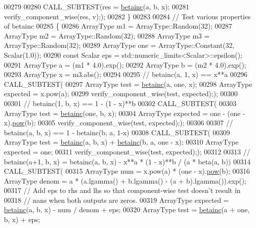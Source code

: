 \begin{DoxyCode}
00279 
00280     CALL\_SUBTEST(res = \hyperlink{namespace_eigen_a726eae91d4e91d8e25cbe55fffa6a92f}{betainc}(a, b, x);
00281                  verify\_component\_wise(res, v););
00282   \}
00283 
00284   \textcolor{comment}{// Test various properties of betainc}
00285   \{
00286     ArrayType m1 = ArrayType::Random(32);
00287     ArrayType m2 = ArrayType::Random(32);
00288     ArrayType m3 = ArrayType::Random(32);
00289     ArrayType one = ArrayType::Constant(32, Scalar(1.0));
00290     \textcolor{keyword}{const} Scalar eps = std::numeric\_limits<Scalar>::epsilon();
00291     ArrayType a = (m1 * 4.0).exp();
00292     ArrayType b = (m2 * 4.0).exp();
00293     ArrayType x = m3.abs();
00294 
00295     \textcolor{comment}{// betainc(a, 1, x) == x**a}
00296     CALL\_SUBTEST(
00297         ArrayType test = \hyperlink{namespace_eigen_a726eae91d4e91d8e25cbe55fffa6a92f}{betainc}(a, one, x);
00298         ArrayType expected = x.pow(a);
00299         verify\_component\_wise(test, expected););
00300 
00301     \textcolor{comment}{// betainc(1, b, x) == 1 - (1 - x)**b}
00302     CALL\_SUBTEST(
00303         ArrayType test = \hyperlink{namespace_eigen_a726eae91d4e91d8e25cbe55fffa6a92f}{betainc}(one, b, x);
00304         ArrayType expected = one - (one - x).\hyperlink{group___core___module_ab6dc101d82e8228a19a8840e3a29c1c9}{pow}(b);
00305         verify\_component\_wise(test, expected););
00306 
00307     \textcolor{comment}{// betainc(a, b, x) == 1 - betainc(b, a, 1-x)}
00308     CALL\_SUBTEST(
00309         ArrayType test = \hyperlink{namespace_eigen_a726eae91d4e91d8e25cbe55fffa6a92f}{betainc}(a, b, x) + \hyperlink{namespace_eigen_a726eae91d4e91d8e25cbe55fffa6a92f}{betainc}(b, a, one - x);
00310         ArrayType expected = one;
00311         verify\_component\_wise(test, expected););
00312 
00313     \textcolor{comment}{// betainc(a+1, b, x) = betainc(a, b, x) - x**a * (1 - x)**b / (a * beta(a, b))}
00314     CALL\_SUBTEST(
00315         ArrayType num = x.pow(a) * (one - x).\hyperlink{group___core___module_ab6dc101d82e8228a19a8840e3a29c1c9}{pow}(b);
00316         ArrayType denom = a * (a.lgamma() + b.lgamma() - (a + b).lgamma()).exp();
00317         \textcolor{comment}{// Add eps to rhs and lhs so that component-wise test doesn't result in}
00318         \textcolor{comment}{// nans when both outputs are zeros.}
00319         ArrayType expected = \hyperlink{namespace_eigen_a726eae91d4e91d8e25cbe55fffa6a92f}{betainc}(a, b, x) - num / denom + eps;
00320         ArrayType test = \hyperlink{namespace_eigen_a726eae91d4e91d8e25cbe55fffa6a92f}{betainc}(a + one, b, x) + eps;

\end{DoxyCode}
